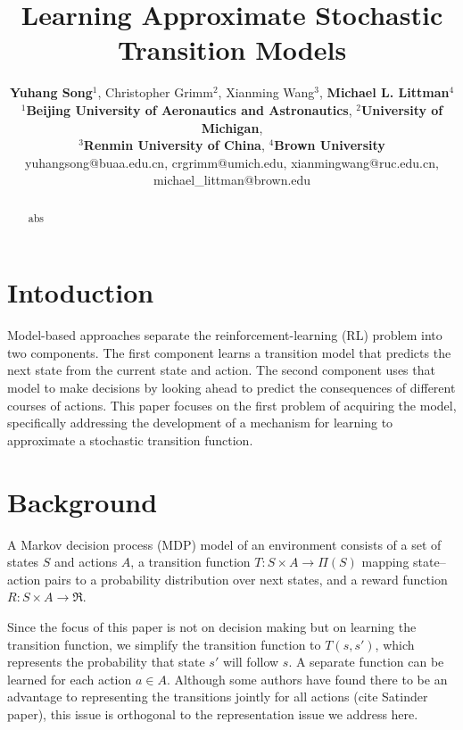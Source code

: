 \documentclass[letterpaper]{article} %
\begin{document}
%
\title{Learning Approximate Stochastic Transition Models}
\author{\textbf{Yuhang Song}$^1$, Christopher Grimm$^2$, Xianming Wang$^3$, \textbf{Michael L. Littman}$^4$ \\
  $^{1}$\textbf{Beijing University of Aeronautics and Astronautics}, $^{2}$\textbf{University of Michigan}, \\ $^{3}$\textbf{Renmin University of China}, $^{4}$\textbf{Brown University}\\
  yuhangsong@buaa.edu.cn, crgrimm@umich.edu, xianmingwang@ruc.edu.cn, michael\_littman@brown.edu}
\maketitle
\begin{abstract}
abs
\end{abstract}

\section{Intoduction}

Model-based approaches separate the reinforcement-learning (RL) problem into two components. The first component learns a transition model that predicts the next state from the current state and action. The second component uses that model to make decisions by looking ahead to predict the consequences of different courses of actions. This paper focuses on the first problem of acquiring the model, specifically addressing the development of a mechanism for learning to approximate a stochastic transition function.

\section{Background}

A Markov decision process (MDP) model of an environment consists of a set of states $S$ and actions $A$, a transition function $T:S\times A \rightarrow \Pi(S)$ mapping state--action pairs to a probability distribution over next states, and a reward function $R:S\times A \rightarrow \Re$.

Since the focus of this paper is not on decision making but on learning the transition function, we simplify the transition function to $T(s,s')$, which represents the probability that state $s'$ will follow $s$. A separate function can be learned for each action $a\in A$. Although some authors have found there to be an advantage to representing the transitions jointly for all actions (cite Satinder paper), this issue is orthogonal to the representation issue we address here.
\end{document}
